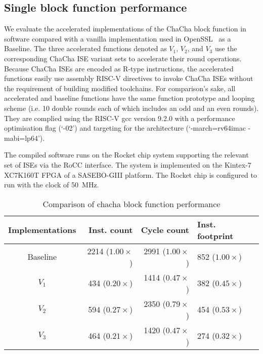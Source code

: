 
\subsection{Single block function performance}
\label{sec:eval:blk}
We evaluate the accelerated implementations of the ChaCha block function in software compared with a vanilla implementation used in OpenSSL~\cite{OpenSSL} as a Baseline. The three accelerated functions denoted as $V_1$, $V_2$, and $V_3$ use the corresponding ChaCha ISE variant sets to accelerate their round operations. 
Because ChaCha ISEs are encoded as R-type instructions, the accelerated functions easily use assembly RISC-V directives  to invoke ChaCha ISEs without the requirement of building modified toolchains.   
For comparison's sake, all accelerated and baseline functions have the same function prototype and looping scheme (i.e. 10 double rounds each of which includes an odd and an even rounds). 
They are complied using the RISC-V gcc version 9.2.0 with a performance optimisation flag (`-02') and targeting for the  architecture (`-march=rv64imac -mabi=lp64'). 

The compiled software runs on the Rocket chip system supporting the relevant set of ISEs via the RoCC interface.
The system is implemented on the Kintex-7 XC7K160T FPGA of a SASEBO-GIII platform.
The Rocket chip is configured to run with the clock of 50~MHz.


\begin{table}[b]
\caption{Comparison of chacha block function performance}
\centering
\label{tab:res:sw:perf1}
\begin{tabular}{crrl}
\toprule            
Implementations        & Inst. count   & Cycle count & Inst. footprint\\

\midrule
Baseline & 2214 ($1.00\times$)     & 2991 ($1.00\times$) &  852 ($1.00\times$)\\
 $V_1$   &  434 ($0.20\times$)     & 1414 ($0.47\times$) &  382 ($0.45\times$)\\
 $V_2$   &  594 ($0.27\times$)     & 2350 ($0.79\times$) &  454 ($0.53\times$)\\
 $V_3$   &  464 ($0.21\times$)     & 1420 ($0.47\times$) &  274 ($0.32\times$)\\

\bottomrule
\end{tabular}
\end{table}

